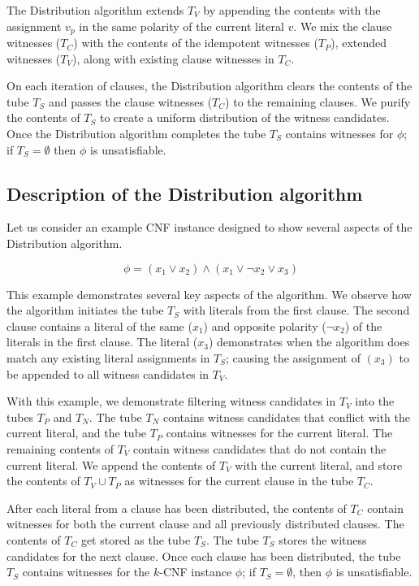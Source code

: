 The Distribution algorithm extends $T_V$ by appending the contents with the assignment $v_p$ in the same polarity of the current literal $v$.  We mix the clause witnesses ($T_C$) with the contents of the idempotent witnesses ($T_P$), extended witnesses ($T_V$), along with existing clause witnesses in $T_C$.

On each iteration of clauses, the Distribution algorithm clears the contents of the tube $T_S$ and passes the clause witnesses ($T_C$) to the remaining clauses.  We purify the contents of $T_S$ to create a uniform distribution of the witness candidates.  Once the Distribution algorithm completes the tube $T_S$ contains witnesses for $\phi$; if $T_S = \emptyset$ then $\phi$ is unsatisfiable.



\FloatBarrier


	\subsection{Description of the Distribution algorithm}

Let us consider an example CNF instance designed to show several aspects of the Distribution algorithm.


\[
	\phi = (x_1 \vee x_2) \wedge (x_1 \vee \neg x_2 \vee x_3)
\]


This example demonstrates several key aspects of the algorithm.  We observe how the algorithm initiates the tube $T_S$  with literals from the first clause.  The second clause contains a literal of the same ($x_1$) and opposite polarity ($\neg x_2$) of the literals in the first clause.  The literal ($x_3$) demonstrates when the algorithm does match any existing literal assignments in $T_S$; causing the assignment of $(x_3)$ to be appended to all witness candidates in $T_V$.

With this example, we demonstrate filtering witness candidates in $T_V$ into the tubes $T_P$ and $T_N$.  The tube $T_N$ contains witness candidates that conflict with the current literal, and the tube $T_P$ contains witnesses for the current literal.  The remaining contents of $T_V$ contain witness candidates that do not contain the current literal.  We append the contents of $T_V$ with the current literal, and store the contents of $T_V \cup T_P$ as witnesses for the current clause in the tube $T_C$.

After each literal from a clause has been distributed, the contents of $T_C$ contain witnesses for both the current clause and all previously distributed clauses.  The contents of $T_C$ get stored as the tube $T_S$.  The tube $T_S$ stores the witness candidates for the next clause.  Once each clause has been distributed, the tube $T_S$ contains witnesses for the $k$-CNF instance $\phi$; if $T_S = \emptyset$, then $\phi$ is unsatisfiable.\\


